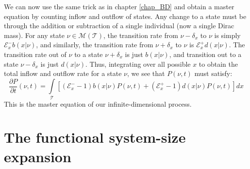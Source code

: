 We can now use the same trick as in chapter \ref{chap_BD} and obtain a master equation by counting inflow and outflow of states. Any change to a state must be through the addition or subtraction of a single individual (now a single Dirac mass). For any state $\nu \in \mathcal{M}(\mathcal{T})$, the transition rate from $\nu - \delta_{x}$ to $\nu$ is simply $\mathcal{E}^{-}_{x}b(x|\nu)$, and similarly, the transition rate from $\nu+\delta_{x}$ to $\nu$ is $\mathcal{E}^{+}_{x}d(x|\nu)$. The transition rate out of $\nu$ to a state $\nu+\delta_x$ is just $b(x|\nu)$, and transition out to a state $\nu - \delta_x$ is just $d(x|\nu)$. Thus, integrating over all possible $x$ to obtain the total inflow and outflow rate for a state $\nu$, we see that $P(\nu,t)$ must satisfy:
\begin{equation}
\label{unnormalized_M_equation}
    \frac{\partial P}{\partial t}(\nu,t) = \int\limits_{\mathcal{T}}\left[(\mathcal{E}^{-}_{x}-1)b(x|\nu)P(\nu,t) + (\mathcal{E}^{+}_{x}-1)d(x|\nu)P(\nu,t)\right]dx
\end{equation}
This is the master equation of our infinite-dimensional process.

\section{The functional system-size expansion}

